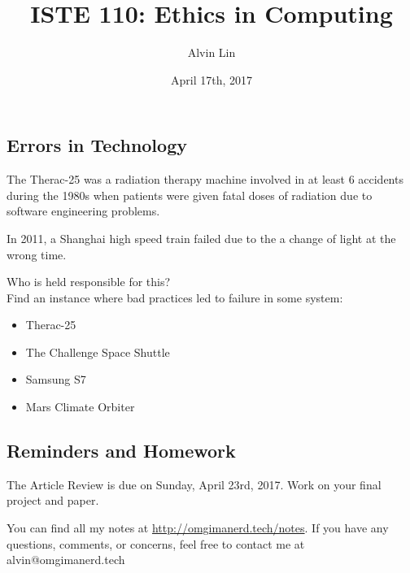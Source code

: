 \documentclass[letterpaper, 12pt]{article}
\title{ISTE 110: Ethics in Computing}
\author{Alvin Lin}
\date{April 17th, 2017}
\begin{document}
\maketitle

\subsection*{Errors in Technology}
The Therac-25 was a radiation therapy machine involved in at least 6 accidents
during the 1980s when patients were given fatal doses of radiation due to
software engineering problems. \par
In 2011, a Shanghai high speed train failed due to the a change of light at
the wrong time. \par
Who is held responsible for this? \\
Find an instance where bad practices led to failure in some system:
\begin{itemize}
  \item Therac-25
  \item The Challenge Space Shuttle
  \item Samsung S7
  \item Mars Climate Orbiter
\end{itemize}

\subsection*{Reminders and Homework}
The Article Review is due on Sunday, April 23rd, 2017.
Work on your final project and paper.

\begin{center}
  You can find all my notes at \url{http://omgimanerd.tech/notes}. If you have
  any questions, comments, or concerns, feel free to contact me at
  alvin@omgimanerd.tech
\end{center}
\end{document}

